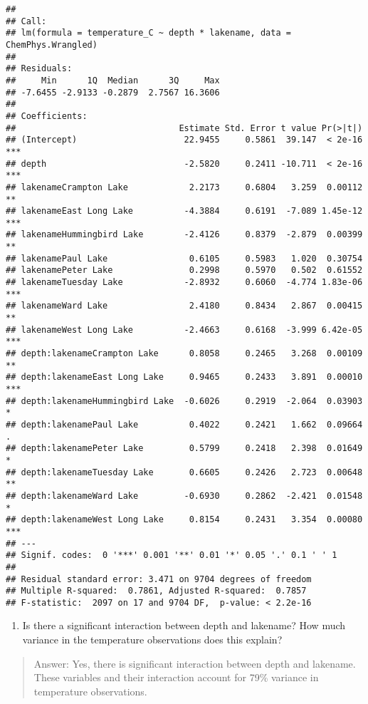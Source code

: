 \documentclass[]{article}
\providecommand{\tightlist}{%
  \setlength{\itemsep}{0pt}\setlength{\parskip}{0pt}}
\begin{document}
\begin{verbatim}
## 
## Call:
## lm(formula = temperature_C ~ depth * lakename, data = ChemPhys.Wrangled)
## 
## Residuals:
##     Min      1Q  Median      3Q     Max 
## -7.6455 -2.9133 -0.2879  2.7567 16.3606 
## 
## Coefficients:
##                                Estimate Std. Error t value Pr(>|t|)    
## (Intercept)                     22.9455     0.5861  39.147  < 2e-16 ***
## depth                           -2.5820     0.2411 -10.711  < 2e-16 ***
## lakenameCrampton Lake            2.2173     0.6804   3.259  0.00112 ** 
## lakenameEast Long Lake          -4.3884     0.6191  -7.089 1.45e-12 ***
## lakenameHummingbird Lake        -2.4126     0.8379  -2.879  0.00399 ** 
## lakenamePaul Lake                0.6105     0.5983   1.020  0.30754    
## lakenamePeter Lake               0.2998     0.5970   0.502  0.61552    
## lakenameTuesday Lake            -2.8932     0.6060  -4.774 1.83e-06 ***
## lakenameWard Lake                2.4180     0.8434   2.867  0.00415 ** 
## lakenameWest Long Lake          -2.4663     0.6168  -3.999 6.42e-05 ***
## depth:lakenameCrampton Lake      0.8058     0.2465   3.268  0.00109 ** 
## depth:lakenameEast Long Lake     0.9465     0.2433   3.891  0.00010 ***
## depth:lakenameHummingbird Lake  -0.6026     0.2919  -2.064  0.03903 *  
## depth:lakenamePaul Lake          0.4022     0.2421   1.662  0.09664 .  
## depth:lakenamePeter Lake         0.5799     0.2418   2.398  0.01649 *  
## depth:lakenameTuesday Lake       0.6605     0.2426   2.723  0.00648 ** 
## depth:lakenameWard Lake         -0.6930     0.2862  -2.421  0.01548 *  
## depth:lakenameWest Long Lake     0.8154     0.2431   3.354  0.00080 ***
## ---
## Signif. codes:  0 '***' 0.001 '**' 0.01 '*' 0.05 '.' 0.1 ' ' 1
## 
## Residual standard error: 3.471 on 9704 degrees of freedom
## Multiple R-squared:  0.7861, Adjusted R-squared:  0.7857 
## F-statistic:  2097 on 17 and 9704 DF,  p-value: < 2.2e-16
\end{verbatim}

\begin{enumerate}
\def\labelenumi{\arabic{enumi}.}
\setcounter{enumi}{6}
\tightlist
\item
  Is there a significant interaction between depth and lakename? How
  much variance in the temperature observations does this explain?
\end{enumerate}

\begin{quote}
Answer: Yes, there is significant interaction between depth and
lakename. These variables and their interaction account for 79\%
variance in temperature observations.
\end{quote}
\end{document}
